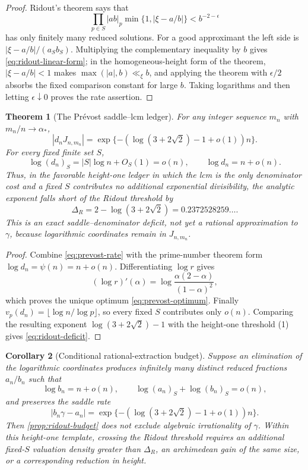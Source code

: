 \documentclass[11pt]{article}
\theoremstyle{keio}
\newtheorem{theorem}{Theorem}[section]
\newtheorem{corollary}[theorem]{Corollary}
\theoremstyle{definition}
\theoremstyle{remark}
\begin{document}
\begin{proof}
Ridout's theorem \cite{Ridout1958} says that
\[
 \prod_{p\in S}|ab|_p
 \min\{1,|\xi-a/b|\}<b^{-2-\epsilon}
\]
has only finitely many reduced solutions.  For a good approximant the left
side is \(|\xi-a/b|/(a_Sb_S)\).  Multiplying the complementary inequality
by \(b\) gives \eqref{eq:ridout-linear-form}; in the homogeneous-height
form of the theorem, \(|\xi-a/b|<1\) makes
\(\max(|a|,b)\ll_\xi b\), and applying the theorem with
\(\epsilon/2\) absorbs the fixed comparison constant for large \(b\).
Taking logarithms and then letting \(\epsilon\downarrow0\) proves the rate
assertion.
\end{proof}

\begin{theorem}[The Pr\'evost saddle--lcm ledger]
\label{thm:prevost-ridout-deficit}
For any integer sequence \(m_n\) with \(m_n/n\to\alpha_*\),
\[
 |d_nJ_{n,m_n}|=
 \exp\{-(\log(3+2\sqrt2)-1+o(1))n\}.
\]
For every fixed finite set \(S\),
\[
 \log(d_n)_S=|S|\log n+O_S(1)=o(n),
 \qquad
 \log d_n=n+o(n).
\]
Thus, in the favorable height-one ledger in which the lcm is the only
denominator cost and a fixed \(S\) contributes no additional exponential
divisibility, the analytic exponent falls short of the Ridout threshold by
\begin{equation}\label{eq:ridout-deficit}
 \boxed{\displaystyle
 \Delta_R=2-\log(3+2\sqrt2)
 =0.2372528259\ldots.}
\end{equation}
This is an exact saddle--denominator deficit, not yet a rational
approximation to \(\gamma\), because logarithmic coordinates remain in
\(J_{n,m_n}\).
\end{theorem}

\begin{proof}
Combine \eqref{eq:prevost-rate} with the prime-number theorem form
\(\log d_n=\psi(n)=n+o(n)\).  Differentiating \(\log r\) gives
\[
 (\log r)'(\alpha)
 =\log\frac{\alpha(2-\alpha)}{(1-\alpha)^2},
\]
which proves the unique optimum \eqref{eq:prevost-optimum}.  Finally
\(v_p(d_n)=\lfloor\log n/\log p\rfloor\), so every fixed \(S\) contributes
only \(o(n)\).  Comparing the resulting exponent
\(\log(3+2\sqrt2)-1\) with the height-one threshold (1) gives
\eqref{eq:ridout-deficit}.
\end{proof}

\begin{corollary}[Conditional rational-extraction budget]
Suppose an elimination of the logarithmic coordinates produces infinitely
many distinct reduced fractions \(a_n/b_n\) such that
\[
 \log b_n=n+o(n),\qquad
 \log(a_n)_S+\log(b_n)_S=o(n),
\]
and preserves the saddle rate
\[
 |b_n\gamma-a_n|
 =\exp\{-(\log(3+2\sqrt2)-1+o(1))n\}.
\]
Then \cref{prop:ridout-budget} does not exclude algebraic irrationality of
\(\gamma\).  Within this height-one template, crossing the Ridout threshold
requires an additional fixed-\(S\) valuation density greater than
\(\Delta_R\), an archimedean gain of the same size, or a corresponding
reduction in height.
\end{corollary}
\end{document}
